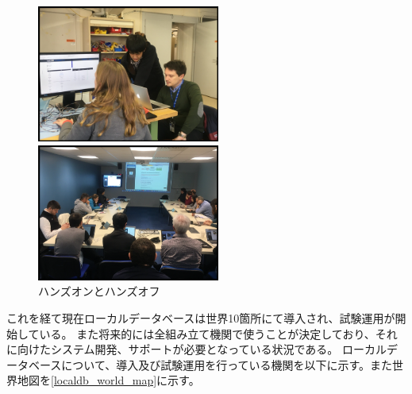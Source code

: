 \begin{figure}[bpt]
  \begin{center}
  \begin{minipage}{0.4\hsize}
    \includegraphics[width=6cm]{hands_on}
  \end{minipage}
  \begin{minipage}{0.4\hsize}
    \includegraphics[width=6cm]{hands_off}
  \end{minipage}
  \caption[ハンズオンとハンズオフ]{ハンズオンとハンズオフ}
  \label{Tutorial_picture}
  \end{center}
\end{figure}

これを経て現在ローカルデータベースは世界10箇所にて導入され、試験運用が開始している。
また将来的には全組み立て機関で使うことが決定しており、それに向けたシステム開発、サポートが必要となっている状況である。
ローカルデータベースについて、導入及び試験運用を行っている機関を以下に示す。また世界地図を\ref{localdb_world_map}に示す。

